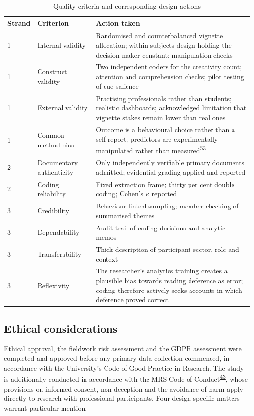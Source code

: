 \documentclass[11pt,a4paper]{article}
\numberwithin{figure}{section}
\numberwithin{table}{section}
\begin{document}
\begin{table}[H]
\centering\footnotesize
\caption{Quality criteria and corresponding design actions}
\label{tab:quality}
\begin{tabularx}{\textwidth}{@{}p{2.1cm} p{3.0cm} X@{}}
\toprule
\textbf{Strand} & \textbf{Criterion} & \textbf{Action taken} \\
\midrule
1 & Internal validity & Randomised and counterbalanced vignette allocation; within-subjects design holding
the decision-maker constant; manipulation checks \\
1 & Construct validity & Two independent coders for the creativity count; attention and comprehension
checks; pilot testing of cue salience \\
1 & External validity & Practising professionals rather than students; realistic dashboards; acknowledged
limitation that vignette stakes remain lower than real ones \\
1 & Common method bias & Outcome is a behavioural choice rather than a self-report; predictors are
experimentally manipulated rather than measured\textsuperscript{\hyperlink{ref53}{53}} \\
2 & Documentary authenticity & Only independently verifiable primary documents admitted; evidential grading
applied and reported \\
2 & Coding reliability & Fixed extraction frame; thirty per cent double coding; Cohen's $\kappa$ reported \\
3 & Credibility & Behaviour-linked sampling; member checking of summarised themes \\
3 & Dependability & Audit trail of coding decisions and analytic memos \\
3 & Transferability & Thick description of participant sector, role and context \\
3 & Reflexivity & The researcher's analytics training creates a plausible bias towards reading deference as
error; coding therefore actively seeks accounts in which deference proved correct \\
\bottomrule
\end{tabularx}
\end{table}

\subsection{Ethical considerations}

Ethical approval, the fieldwork risk assessment and the GDPR assessment were completed and approved before
any primary data collection commenced, in accordance with the University's Code of Good Practice in
Research. The study is additionally conducted in accordance with the MRS Code of Conduct\textsuperscript{\hyperlink{ref43}{43}}, whose
provisions on informed consent, non-deception and the avoidance of harm apply directly to research with
professional participants. Four design-specific matters warrant particular mention.
\end{document}
